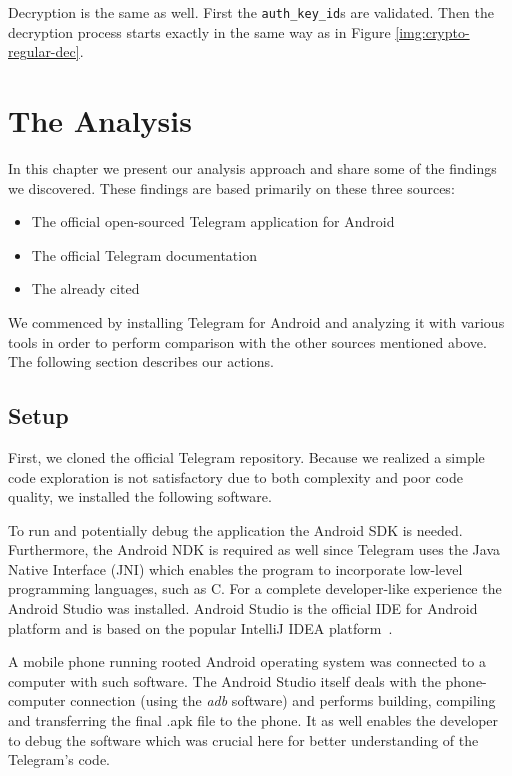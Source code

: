 \documentclass[thesis=M,english]{FITthesis}[2012/10/20]
\begin{document}
Decryption is the same as well. First the \texttt{auth\_key\_id}s are validated.  Then the decryption process starts exactly in the same way as in Figure \ref{img:crypto-regular-dec}.





\chapter{The Analysis}\label{analysis}

In this chapter we present our analysis approach and share some of the findings we discovered. These findings are based primarily on these three sources:

\begin{itemize}
	\item The official open-sourced Telegram application for Android
	\item The official Telegram documentation
	\item The already cited~\cite{telegram-aarhus}
\end{itemize}

We commenced by installing Telegram for Android and analyzing it with various tools in order to perform comparison with the other sources mentioned above. The following section describes our actions.

\section{Setup}\label{analysis-setup}

First, we cloned the official Telegram repository. Because we realized a simple code exploration is not satisfactory due to both complexity and poor code quality, we installed the following software.

To run and potentially debug the application the Android SDK is needed. Furthermore, the Android NDK is required as well since Telegram uses the Java Native Interface (JNI) which enables the program to incorporate low-level programming languages, such as C. For a complete developer-like experience the Android Studio was installed. Android Studio is the official IDE for Android platform and is based on the popular IntelliJ IDEA platform~\cite{android-studio}.

A mobile phone running rooted Android operating system was connected to a computer with such software. The Android Studio itself deals with the phone-computer connection (using the \emph{adb} software) and performs building, compiling and transferring the final .apk file to the phone. It as well enables the developer to debug the software which was crucial here for better understanding of the Telegram's code.
\end{document}

